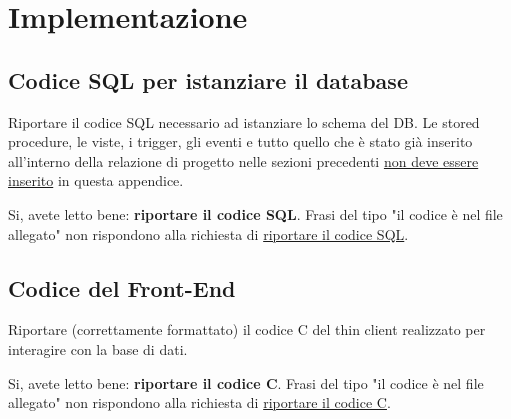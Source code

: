 \section{Implementazione}

\subsection*{Codice SQL per istanziare il database}

\begin{templateblock}
    Riportare il codice SQL necessario ad istanziare lo schema del DB.
    Le stored procedure, le viste, i trigger, gli eventi e tutto quello che
    è stato già inserito all’interno della relazione di progetto nelle sezioni
    precedenti \underline{non deve essere inserito} in questa appendice.

    Si, avete letto bene: \textbf{riportare il codice SQL}. Frasi del tipo
    "il codice è nel file allegato" non rispondono alla richiesta di
    \underline{riportare il codice SQL}.
\end{templateblock}

\subsection*{Codice del Front-End}

\begin{templateblock}
    Riportare (correttamente formattato) il codice C del thin client realizzato
    per interagire con la base di dati.

    Si, avete letto bene: \textbf{riportare il codice C}. Frasi del tipo
    "il codice è nel file allegato" non rispondono alla richiesta di
    \underline{riportare il codice C}.
\end{templateblock}
